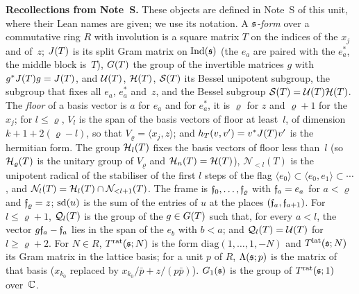 \documentclass[11pt,a4paper]{article}
\newcommand{\subhead}[1]{\par\addvspace{9pt plus 2pt}\Needspace{4\baselineskip}\noindent\textbf{#1}\enspace\ignorespaces}
\theoremstyle{plainx}
\theoremstyle{uprightx}
\newcommand{\Nb}[2]{\mathcal{N}_{<#1}(#2)}            %
\newcommand{\Nf}[2]{\mathcal{N}_{#1}(#2)}             %
\begin{document}
\subhead{Recollections from Note~S.}\label{s:recall}
These objects are defined in Note~S of this unit, where their Lean names are given; we use its notation. A
\emph{$\mathfrak{s}$-form} over a commutative ring $R$ with involution is a square matrix $T$ on the indices of the $x_j$ and
of~$z$; $J(T)$ is its split Gram matrix on $\operatorname{Ind}(\mathfrak{s})$ (the $e_a$ are paired with the $e^*_a$, the middle block
is~$T$), $G(T)$ the group of the invertible matrices $g$ with $g^{*}J(T)g=J(T)$, and $\mathcal{U}(T)$, $\mathcal{H}(T)$,
$\mathcal{S}(T)$ its Bessel unipotent subgroup, the subgroup that fixes all $e_a$, $e^*_a$ and~$z$, and the Bessel subgroup
$\mathcal{S}(T)=\mathcal{U}(T)\mathcal{H}(T)$. The \emph{floor} of a basis vector is $a$ for $e_a$ and for $e^*_a$, it is $\varrho$ for $z$
and $\varrho+1$ for the $x_j$; for $l\le\varrho$, $V_l$ is the span of the basis vectors of floor at least~$l$, of
dimension $k+1+2(\varrho-l)$, so that $V_\varrho=\langle x_j,z\rangle$; and $h_T(v,v')=v^{*}J(T)v'$ is the hermitian
form. The group $\mathcal{H}_{l}(T)$ fixes the basis vectors of floor less than~$l$ (so $\mathcal{H}_{\varrho}(T)$ is the
unitary group of $V_\varrho$ and $\mathcal{H}_{n}(T)=\mathcal{H}(T)$), $\Nb{l}{T}$ is the unipotent radical of the
stabiliser of the first $l$ steps of the flag $\langle e_0\rangle\subset\langle e_0,e_1\rangle\subset\cdots$, and
$\Nf{l}{T}=\Hl{l}{T}\cap\Nb{l+1}{T}$. The frame is $\mathfrak{f}_{0},\dots,\mathfrak{f}_{\varrho}$ with $\mathfrak{f}_{a}=e_a$ for $a<\varrho$ and
$\mathfrak{f}_{\varrho}=z$; $\operatorname{sd}(u)$ is the sum of the entries of $u$ at the places $(\mathfrak{f}_{a},\mathfrak{f}_{a+1})$. For $l\le\varrho+1$,
$\mathcal{Q}_{l}(T)$ is the group of the $g\in G(T)$ such that, for every $a<l$, the vector $g\mathfrak{f}_{a}-\mathfrak{f}_{a}$ lies in the span
of the $e_b$ with $b<a$; and $\mathcal{Q}_{l}(T)=\mathcal{U}(T)$ for $l\ge\varrho+2$. For $N\in R$,
$T^{\mathrm{rat}}(\mathfrak{s};N)$ is the form $\mathrm{diag}(1,\dots,1,-N)$ and $T^{\mathrm{lat}}(\mathfrak{s};N)$ its Gram matrix in the lattice basis;
for a unit $p$ of $R$, $\Lambda(\mathfrak{s};p)$ is the matrix of that basis ($x_{k_0}$ replaced by
$x_{k_0}/\bar p+z/(p\bar p)$). $G_{1}(\mathfrak{s})$ is the group of $T^{\mathrm{rat}}(\mathfrak{s};1)$ over~$\mathbb{C}$.
\end{document}
